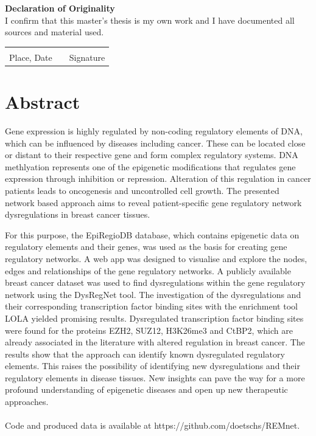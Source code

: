 \documentclass[pdftex,12pt,a4paper]{report}
\begin{document}
\newpage
\phantom{oben}
\vfill
\begin{center}
\large\textbf{Declaration of Originality}\normalsize\\
\vspace{0.5cm}
I confirm that this master's thesis is my own work and I have documented all sources and material used.\\
\vspace{1.5cm}
\begin{tabular}{lp{2em}l}
 \hspace{3cm}   && \hspace{3cm} \\\cline{1-1}\cline{3-3}
 Place, Date     && Signature
\end{tabular}
\end{center}
\vfill

\tableofcontents

\chapter*{Abstract}
Gene expression is highly regulated by non-coding regulatory elements of DNA, which can be influenced by diseases including cancer. These can be located close or distant to their respective gene and form complex regulatory systems. DNA methlyation represents one of the epigenetic modifications that regulates gene expression through inhibition or repression. Alteration of this regulation in cancer patients leads to oncogenesis and uncontrolled cell growth. The presented network based approach aims to reveal patient-specific gene regulatory network dysregulations in breast cancer tissues.

For this purpose, the EpiRegioDB database, which contains epigenetic data on regulatory elements and their genes, was used as the basis for creating gene regulatory networks. A web app was designed to visualise and explore the nodes, edges and relationships of the gene regulatory networks.  A publicly available breast cancer dataset was used to find dysregulations within the gene regulatory network using the DysRegNet tool. The investigation of the dysregulations and their corresponding transcription factor binding sites with the enrichment tool LOLA yielded promising results. Dysregulated transcription factor binding sites were found for the proteins EZH2, SUZ12, H3K26me3 and CtBP2, which are already associated in the literature with altered regulation in breast cancer. The results show that the approach can identify known dysregulated regulatory elements. This raises the possibility of identifying new dysregulations and their regulatory elements in disease tissues. New insights can pave the way for a more profound understanding of epigenetic diseases and open up new therapeutic approaches.\\\\
Code and produced data is available at https://github.com/doetschs/REMnet.
 
\end{document}

